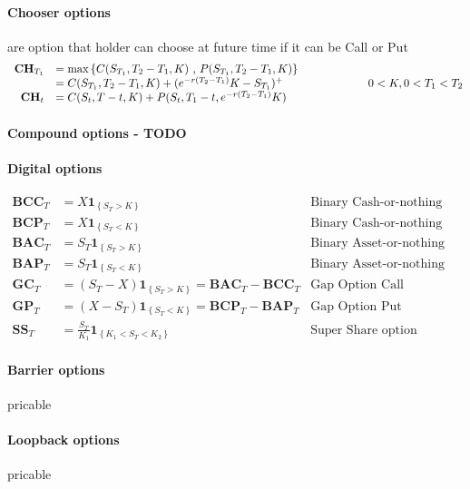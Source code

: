 \documentclass[a4paper,10pt]{article}
\begin{document}
\paragraph{Chooser options} are option that holder can choose at future time if it can be Call or Put
\[
\begin{array}{rl}
\textbf{CH}_{T_1} &=  \text{max}\left\{ C( S_{T_1} ,T_2 - T_1, K ) \hbox{ , }  P( S_{T_1} ,T_2 - T_1, K ) \right\}  \\
                  &=  C( S_{T_1} ,T_2 - T_1, K ) + (e^{-r(T_2-T_1)}K - S_{T_1} )^+     \\
\textbf{CH}_{t}   &=  C(S_t, T-t, K) + P(S_t, T_1 -t, e^{-r(T_2-T_1)}K)
\end{array}
\hspace{2cm}
0<K,0<T_1<T_2
\]
\paragraph{Compound options - TODO}
\paragraph{Digital options}
\[
\begin{array}{rll}
\textbf{BCC}_T &= X\mathbf{1}_{\left\{S_T>K\right\}} & \text{Binary Cash-or-nothing Call} \\
\textbf{BCP}_T &= X\mathbf{1}_{\left\{S_T<K\right\}} & \text{Binary Cash-or-nothing Put}  \\
\textbf{BAC}_T &= S_T\mathbf{1}_{\left\{S_T>K\right\}} & \text{Binary Asset-or-nothing Call} \\
\textbf{BAP}_T &= S_T\mathbf{1}_{\left\{S_T<K\right\}} & \text{Binary Asset-or-nothing Put}  \\
\textbf{GC}_T &= (S_T-X)\mathbf{1}_{\left\{S_T>K\right\}}=\textbf{BAC}_T - \textbf{BCC}_T & \text{Gap Option Call}  \\
\textbf{GP}_T &= (X-S_T)\mathbf{1}_{\left\{S_T<K\right\}}=\textbf{BCP}_T - \textbf{BAP}_T & \text{Gap Option Put}   \\
\textbf{SS}_T &=\frac{S_T}{K_1} \mathbf{1}_{\left\{K_1<S_T<K_2\right\}} & \text{Super Share option}   
\end{array}
\]
\paragraph{Barrier options} pricable
\paragraph{Loopback options} pricable
\end{document}
